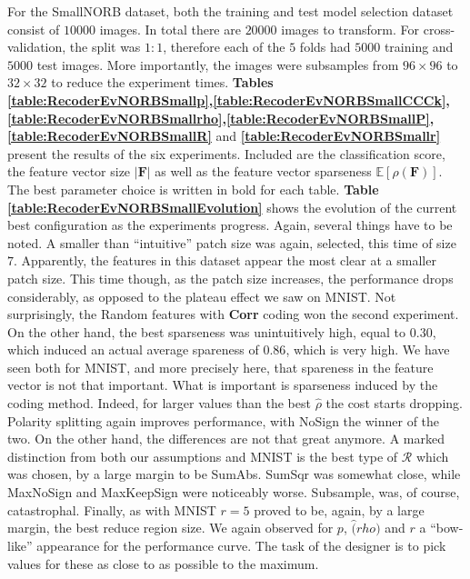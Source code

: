 \documentclass[12pt,a4paper,oneside,english]{UPBThesis}
\newcommand{\hctimes}[2]{{#1}\!\times\!{#2}}
\begin{document}
For the SmallNORB dataset, both the training and test model selection dataset consist of $10000$ images. In total there are $20000$ images to transform. For cross-validation, the split was $1:1$, therefore each of the $5$ folds had $5000$ training and $5000$ test images. More importantly, the images were subsamples from $\hctimes{96}{96}$ to $\hctimes{32}{32}$ to reduce the experiment times. \textbf{Tables \ref{table:RecoderEvNORBSmallp},\ref{table:RecoderEvNORBSmallCCCk},\ref{table:RecoderEvNORBSmallrho},\ref{table:RecoderEvNORBSmallP},\ref{table:RecoderEvNORBSmallR}} and \textbf{\ref{table:RecoderEvNORBSmallr}} present the results of the six experiments. Included are the classification score, the feature vector size $\left| \textbf{F} \right|$ as well as the feature vector sparseness $\mathbb{E}[\rho(\textbf{F})]$. The best parameter choice is written in bold for each table. \textbf{Table \ref{table:RecoderEvNORBSmallEvolution}} shows the evolution of the current best configuration as the experiments progress. Again, several things have to be noted. A smaller than ``intuitive'' patch size was again, selected, this time of size $7$. Apparently, the features in this dataset appear the most clear at a smaller patch size. This time though, as the patch size increases, the performance drops considerably, as opposed to the plateau effect we saw on MNIST. Not surprisingly, the Random features with \textbf{Corr} coding won the second experiment. On the other hand, the best sparseness was unintuitively high, equal to $0.30$, which induced an actual average spareness of $0.86$, which is very high. We have seen both for MNIST, and more precisely here, that spareness in the feature vector is not that important. What is important is sparseness induced by the coding method. Indeed, for larger values than the best $\hat{\rho}$ the cost starts dropping. Polarity splitting again improves performance, with NoSign the winner of the two. On the other hand, the differences are not that great anymore. A marked distinction from both our assumptions and MNIST is the best type of $\mathcal{R}$ which was chosen, by a large margin to be SumAbs. SumSqr was somewhat close, while MaxNoSign and MaxKeepSign were noticeably worse. Subsample, was, of course, catastrophal. Finally, as with MNIST $r=5$ proved to be, again, by a large margin, the best reduce region size. We again observed for $p$, $\hat(rho)$ and $r$ a ``bow-like'' appearance for the performance curve. The task of the designer is to pick values for these as close to as possible to the maximum.
\end{document}

